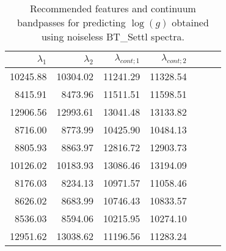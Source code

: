 %
% 
\begin{table}
\begin{center}
\begin{tabular}{rrrrrrr}
  \hline
  $\lambda_1$ & $\lambda_2$ & $\lambda_{cont;1}$ & $\lambda_{cont;2} $ \\ 
  \hline
     10245.88 & 10304.02 &	11241.29 & 11328.54 \\
     8415.91  & 8473.96  &	11511.51 & 11598.51\\
     12906.56 & 12993.61 &	13041.48 & 13133.82\\
     8716.00  & 8773.99  &	10425.90 & 10484.13\\
     8805.93  & 8863.97  &	12816.72 & 12903.73\\
     10126.02 & 10183.93 &	13086.46 & 13194.09\\
     8176.03  & 8234.13  &	10971.57 & 11058.46\\
     8626.02  & 8683.99  &	10746.43 & 10833.57\\
     8536.03  & 8594.06  &	10215.95 & 10274.10\\
     12951.62 & 13038.62 &	11196.56 & 11283.24 \\

\hline
\end{tabular}
\caption {Recommended features and continuum bandpasses for predicting $\log(g)$ 
      obtained using noiseless BT\_Settl spectra.} \label{tab:tab_SNRoo_G}
\end{center}
\end{table}

